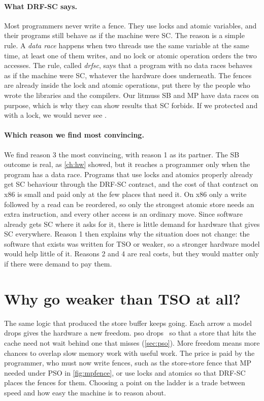\paragraph{What DRF-SC says.}\label{par:drf} Most programmers never write a \gls{fence}. They use locks and atomic variables, and their programs still behave as if the machine were SC. The reason is a simple rule. A \emph{data race} happens when two threads use the same variable at the same time, at least one of them writes, and no lock or atomic operation orders the two accesses. The rule, called \emph{\gls{drfsc}}, says that a program with no data races behaves as if the machine were SC, whatever the hardware does underneath. The fences are already inside the lock and atomic operations, put there by the people who wrote the libraries and the compilers. Our \gls{litmus}s SB and MP have data races on purpose, which is why they can show results that SC forbids. If we protected  and  with a lock, we would never see .

\paragraph{Which reason we find most convincing.} We find reason 3 the most convincing, with reason 1 as its partner. The SB outcome is real, as \cref{ch:hw} showed, but it reaches a programmer only when the program has a data race. Programs that use locks and atomics properly already get SC behaviour through the DRF-SC contract, and the cost of that contract on x86 is small and paid only at the few places that need it. On x86 only a write followed by a read can be reordered, so only the strongest atomic store needs an extra instruction, and every other access is an ordinary move. Since software already gets SC where it asks for it, there is little demand for hardware that gives SC everywhere. Reason 1 then explains why the situation does not change: the software that exists was written for TSO or weaker, so a stronger hardware model would help little of it. Reasons 2 and 4 are real costs, but they would matter only if there were demand to pay them.

\section{Why go weaker than TSO at all?}
\label{sec:weaker}

The same logic that produced the store buffer keeps going. Each arrow a model drops gives the hardware a new freedom. \gls{pso} drops \WW\ so that a store that hits the cache need not wait behind one that misses (\cref{sec:pso}). More freedom means more chances to overlap slow memory work with useful work. The price is paid by the programmer, who must now write fences, such as the store-store fence that MP needed under PSO in \cref{fig:mpfence}, or use locks and atomics so that DRF-SC places the fences for them. Choosing a point on the ladder is a trade between speed and how easy the machine is to reason about.

